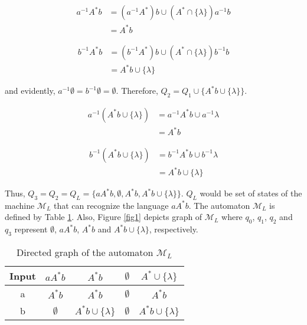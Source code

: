 \begin{equation}
\begin{aligned}
a^{-1}A^*b &= (a^{-1}A^*)b \cup (A^* \cap \{\lambda\})a^{-1}b\\
&= A^*b
\end{aligned}
\end{equation}

\begin{equation}
\begin{aligned}
b^{-1}A^*b &= (b^{-1}A^*)b \cup (A^* \cap \{\lambda\})b^{-1}b\\
&= A^*b \cup \{\lambda\}
\end{aligned}
\end{equation}

and evidently, $a^{-1}\emptyset = b^{-1}\emptyset = \emptyset$.
Therefore, $Q_2 = Q_1 \cup \{A^*b \cup \{\lambda\}\}$.

\begin{equation}
\begin{aligned}
a^{-1}(A^*b\cup\{\lambda \}) &= a^{-1}A^*b \cup a^{-1}\lambda\\
&= A^*b
\end{aligned}
\end{equation}

\begin{equation}
\begin{aligned}
b^{-1}(A^*b\cup\{\lambda \}) &= b^{-1}A^*b \cup b^{-1}\lambda\\
&= A^*b \cup \{\lambda \}
\end{aligned}
\end{equation}

Thus, $Q_3 = Q_2 = Q_L = \{aA^*b, \emptyset, A^*b, A^*b\cup\{\lambda \} \}$.
$Q_L$ would be set of states of the machine $\mathcal{M}_L$ that can recognize the language $aA^*b$.
The automaton $\mathcal{M}_L$ is defined by Table \ref{tab1}.
Also, Figure \ref{fig1} depicts graph of $\mathcal{M}_L$ where $q_0$, $q_1$, $q_2$ and $q_3$ represent $\emptyset$, $aA^*b$, $A^*b$ and $A^*b\cup\{\lambda \}$, respectively.

\begin{table}\centering
	\begin{tabular}[H!]{|c||c|c|c|c|}
		\hline
		Input & $aA^*b$ & $A^*b$ & $\emptyset$ & $A^*\cup \{\lambda \}$\\
		\hline
		a & $A^*b$ & $A^*b$& $\emptyset$& $A^*b$\\
		b & $\emptyset$ & $A^*b\cup \{\lambda \}$& $\emptyset$ & $A^*b \cup \{\lambda \}$\\
		\hline
	\end{tabular}
	\caption{Directed graph of the automaton $\mathcal{M}_L$}\label{tab1}
\end{table}

